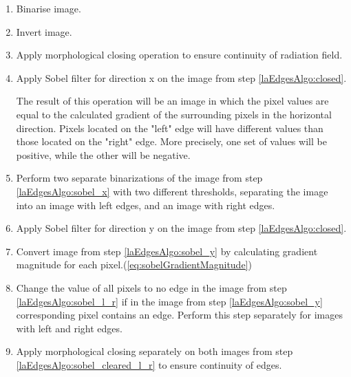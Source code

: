 \begin{enumerate}

    \item Binarise image.
    \label{laEdgesAlgo:binarised}
    
    \item Invert image.

    \item Apply morphological closing operation to ensure continuity of radiation field.
    \label{laEdgesAlgo:closed}

    \item Apply Sobel filter for direction x on the image from step \ref{laEdgesAlgo:closed}.
    \label{laEdgesAlgo:sobel_x}

    The result of this operation will be an image in which the pixel values are equal to the calculated gradient of the surrounding pixels in the horizontal direction. Pixels located on the "left" edge will have different values than those located on the "right" edge. More precisely, one set of values will be positive, while the other will be negative.
    

    \item Perform two separate binarizations of the image from step \ref{laEdgesAlgo:sobel_x} with two different thresholds, separating the image into an image with left edges, and an image with right edges.
    \label{laEdgesAlgo:sobel_l_r}

    \item Apply Sobel filter for direction y on the image from step \ref{laEdgesAlgo:closed}.
    \label{laEdgesAlgo:sobel_y}

    \item Convert image from step \ref{laEdgesAlgo:sobel_y} by calculating gradient magnitude for each pixel.(\autoref{eq:sobelGradientMagnitude})

    \item Change the value of all pixels to no edge in the image from step \ref{laEdgesAlgo:sobel_l_r} if in the image from step \ref{laEdgesAlgo:sobel_y} corresponding pixel contains an edge. Perform this step separately for images with left and right edges.
    \label{laEdgesAlgo:sobel_cleared_l_r}

    \item Apply morphological closing separately on both images from step \ref{laEdgesAlgo:sobel_cleared_l_r} to ensure continuity of edges.
    \label{laEdgesAlgo:finallyClosed}
    
\end{enumerate}
